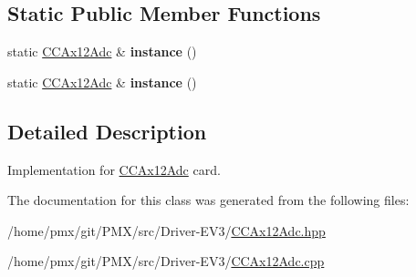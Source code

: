 \subsection*{Static Public Member Functions}
\begin{DoxyCompactItemize}
\item 
\mbox{\label{classCCAx12Adc_a37d9e4779ae37994fec1f41d55cea0e8}} 
static \hyperlink{classCCAx12Adc}{C\+C\+Ax12\+Adc} \& {\bfseries instance} ()
\item 
\mbox{\label{classCCAx12Adc_a37d9e4779ae37994fec1f41d55cea0e8}} 
static \hyperlink{classCCAx12Adc}{C\+C\+Ax12\+Adc} \& {\bfseries instance} ()
\end{DoxyCompactItemize}


\subsection{Detailed Description}
Implementation for \hyperlink{classCCAx12Adc}{C\+C\+Ax12\+Adc} card. 

The documentation for this class was generated from the following files\+:\begin{DoxyCompactItemize}
\item 
/home/pmx/git/\+P\+M\+X/src/\+Driver-\/\+E\+V3/\hyperlink{Driver-EV3_2CCAx12Adc_8hpp}{C\+C\+Ax12\+Adc.\+hpp}\item 
/home/pmx/git/\+P\+M\+X/src/\+Driver-\/\+E\+V3/\hyperlink{Driver-EV3_2CCAx12Adc_8cpp}{C\+C\+Ax12\+Adc.\+cpp}\end{DoxyCompactItemize}
